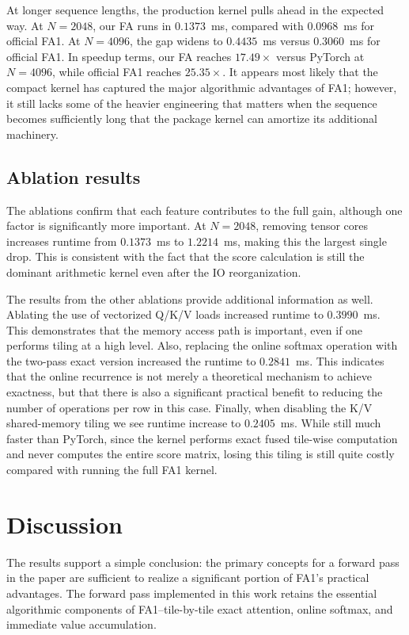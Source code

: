 \documentclass{article}
\begin{document}
At longer sequence lengths, the production kernel pulls ahead in the expected way. At $N=2048$, our FA runs in $0.1373$~ms, compared with $0.0968$~ms for official FA1. At $N=4096$, the gap widens to $0.4435$~ms versus $0.3060$~ms for official FA1. In speedup terms, our FA reaches $17.49\times$ versus PyTorch at $N=4096$, while official FA1 reaches $25.35\times$. It appears most likely that the compact kernel has captured the major algorithmic advantages of FA1; however, it still lacks some of the heavier engineering that matters when the sequence becomes sufficiently long that the package kernel can amortize its additional machinery.

\subsection{Ablation results}
The ablations confirm that each feature contributes to the full gain, although one factor is significantly more important. At $N=2048$, removing tensor cores increases runtime from $0.1373$~ms to $1.2214$~ms, making this the largest single drop. This is consistent with the fact that the score calculation is still the dominant arithmetic kernel even after the IO reorganization.

The results from the other ablations provide additional information as well. Ablating the use of vectorized Q/K/V loads increased runtime to $0.3990$~ms. This demonstrates that the memory access path is important, even if one performs tiling at a high level. Also, replacing the online softmax operation with the two-pass exact version increased the runtime to $0.2841$~ms. This indicates that the online recurrence is not merely a theoretical mechanism to achieve exactness, but that there is also a significant practical benefit to reducing the number of operations per row in this case. Finally, when disabling the K/V shared-memory tiling we see runtime increase to $0.2405$~ms. While still much faster than PyTorch, since the kernel performs exact fused tile-wise computation and never computes the entire score matrix, losing this tiling is still quite costly compared with running the full FA1 kernel.

\section{Discussion}
The results support a simple conclusion: the primary concepts for a forward pass in the paper are sufficient to realize a significant portion of FA1's practical advantages. The forward pass implemented in this work retains the essential algorithmic components of FA1--tile-by-tile exact attention, online softmax, and immediate value accumulation.
\end{document}
